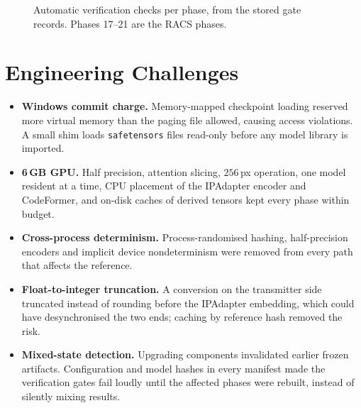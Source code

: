 \begin{figure}[H]
	\centering
	\caption{Automatic verification checks per phase, from the stored gate records. Phases 17--21 are the RACS phases.}
	\label{fig:gates}
\end{figure}

\section{Engineering Challenges}
\begin{itemize}
	\item \textbf{Windows commit charge.} Memory-mapped checkpoint loading reserved more virtual
	memory than the paging file allowed, causing access violations. A small shim loads
	\texttt{safetensors} files read-only before any model library is imported.
	\item \textbf{6\,GB GPU.} Half precision, attention slicing, $256$\,px operation, one model
	resident at a time, CPU placement of the IPAdapter encoder and CodeFormer, and on-disk caches
	of derived tensors kept every phase within budget.
	\item \textbf{Cross-process determinism.} Process-randomised hashing, half-precision encoders
	and implicit device nondeterminism were removed from every path that affects the reference.
	\item \textbf{Float-to-integer truncation.} A conversion on the transmitter side truncated
	instead of rounding before the IPAdapter embedding, which could have desynchronised the two
	ends; caching by reference hash removed the risk.
	\item \textbf{Mixed-state detection.} Upgrading components invalidated earlier frozen
	artifacts. Configuration and model hashes in every manifest made the verification gates fail
	loudly until the affected phases were rebuilt, instead of silently mixing results.
\end{itemize}
